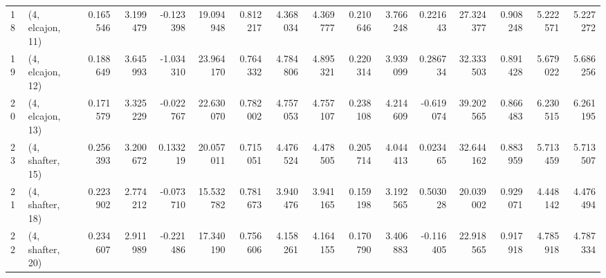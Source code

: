 \begin{tabular}{llrrrrrrrrrrrrrr}
18 &  (4, elcajon, 11) &   0.165546 &  3.199479 & -0.123398 &  19.094948 &  0.812217 &   4.368034 &  4.369777 &  0.210646 &  3.766248 &  0.221643 &   27.324377 &  0.908248 &   5.222571 &   5.227272 \\
19 &  (4, elcajon, 12) &   0.188649 &  3.645993 & -1.034310 &  23.964170 &  0.764332 &   4.784806 &  4.895321 &  0.220314 &  3.939099 &  0.286734 &   32.333503 &  0.891428 &   5.679022 &   5.686256 \\
20 &  (4, elcajon, 13) &   0.171579 &  3.325229 & -0.022767 &  22.630070 &  0.782002 &   4.757053 &  4.757107 &  0.238108 &  4.214609 & -0.619074 &   39.202565 &  0.866483 &   6.230515 &   6.261195 \\
23 &  (4, shafter, 15) &   0.256393 &  3.200672 &  0.133219 &  20.057011 &  0.715051 &   4.476524 &  4.478505 &  0.205714 &  4.044413 &  0.023465 &   32.644162 &  0.883959 &   5.713459 &   5.713507 \\
21 &  (4, shafter, 18) &   0.223902 &  2.774212 & -0.073710 &  15.532782 &  0.781673 &   3.940476 &  3.941165 &  0.159198 &  3.192565 &  0.503028 &   20.039002 &  0.929071 &   4.448142 &   4.476494 \\
22 &  (4, shafter, 20) &   0.234607 &  2.911989 & -0.221486 &  17.340190 &  0.756606 &   4.158261 &  4.164155 &  0.170790 &  3.406883 & -0.116405 &   22.918565 &  0.917918 &   4.785918 &   4.787334 \\
\bottomrule
\end{tabular}
